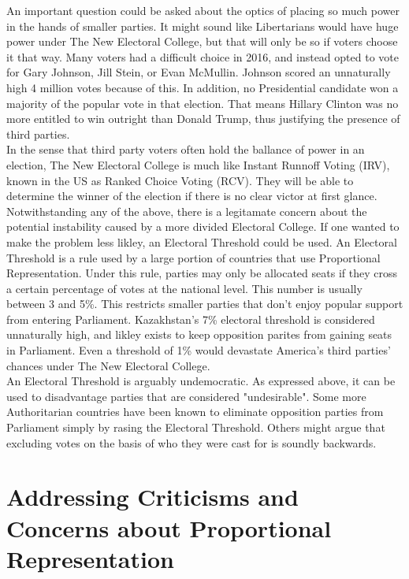 \documentclass{article}
\begin{document}
    An important question could be asked about the optics of placing so much power in the hands of smaller parties. It might sound like Libertarians would have huge power under The New Electoral College, but that will only be so if voters choose it that way. Many voters had a difficult choice in 2016, and instead opted to vote for Gary Johnson, Jill Stein, or Evan McMullin. Johnson scored an unnaturally high 4 million votes because of this. In addition, no Presidential candidate won a majority of the popular vote in that election. That means Hillary Clinton was no more entitled to win outright than Donald Trump, thus justifying the presence of third parties.\\

    In the sense that third party voters often hold the ballance of power in an election, The New Electoral College is much like Instant Runnoff Voting (IRV), known in the US as Ranked Choice Voting (RCV). They will be able to determine the winner of the election if there is no clear victor at first glance.\\

    Notwithstanding any of the above, there is a legitamate concern about the potential instability caused by a more divided Electoral College. If one wanted to make the problem less likley, an Electoral Threshold could be used. An Electoral Threshold is a rule used by a large portion of countries that use Proportional Representation. Under this rule, parties may only be allocated seats if they cross a certain percentage of votes at the national level. This number is usually between 3 and 5\%. This restricts smaller parties that don't enjoy popular support from entering Parliament. Kazakhstan's 7\% electoral threshold is considered unnaturally high, and likley exists to keep opposition parites from gaining seats in Parliament. Even a threshold of 1\% would devastate America's third parties' chances under The New Electoral College.\\

    An Electoral Threshold is arguably undemocratic. As expressed above, it can be used to disadvantage parties that are considered "undesirable". Some more Authoritarian countries have been known to eliminate opposition parties from Parliament simply by rasing the Electoral Threshold. Others might argue that excluding votes on the basis of who they were cast for is soundly backwards.\\

    \section{Addressing Criticisms and Concerns about Proportional Representation}%
\end{document}
